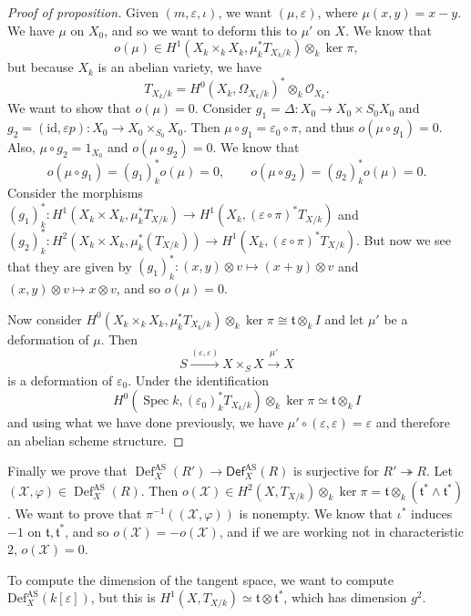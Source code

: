 \documentclass[leqno, openany]{memoir}
\theoremstyle{definition}
\theoremstyle{remark}
\theoremstyle{plain}
\theoremstyle{definition}
\theoremstyle{remark}
\newcommand{\ep}{\varepsilon}
\newcommand{\mc}[1]{\mathcal{#1}}
\newcommand{\mf}[1]{\mathfrak{#1}}
\newcommand{\mr}[1]{\mathrm{#1}}
\newcommand{\ms}[1]{\mathsf{#1}}
\DeclareMathOperator{\Def}{Def}
\DeclareMathOperator{\Spec}{Spec}
\begin{document}
\begin{proof}[Proof of proposition]
    Given $(m, \ep, \iota)$, we want $(\mu, \ep)$, where $\mu(x,y) = x-y$. We have $\mu$ on $X_0$, and so we want to deform this to $\mu'$ on $X$. We know that
    \[ o(\mu) \in H^1(X_k \times_k X_k, \mu_k^* T_{X_k/k}) \otimes_k \ker \pi, \]
    but because $X_k$ is an abelian variety, we have
    \[ T_{X_k/k} = H^0(X_k, \Omega_{X_k/k})^* \otimes_k \mc{O}_{X_k}. \]
    We want to show that $o(\mu) = 0$. Consider $g_1 = \Delta \colon X_0 \to X_0 \times S_0 X_0$ and $g_2 = (\mr{id}, \ep p) \colon X_0 \to X_0 \times_{S_0} X_0$. Then $\mu \circ g_1 = \ep_0 \circ \pi$, and thus $o(\mu \circ g_1) = 0$. Also, $\mu \circ g_2 = 1_{X_0}$ and $o(\mu \circ g_2) = 0$. We know that
    \[ o(\mu \circ g_1) = (g_1)_k^* o(\mu) = 0, \qquad o(\mu \circ g_2) = (g_2)_k^* o(\mu) = 0. \]
    Consider the morphisms $(g_1)_k^* \colon H^1(X_k \times X_k, \mu_k^* T_{X/k}) \to H^1(X_k, (\ep \circ \pi)^* T_{X/k})$ and $(g_2)_k^* \colon H^2(X_k \times X_k, \mu_k^*(T_{X/k})) \to H^1(X_k, (\ep \circ \pi)^* T_{X/k})$. But now we see that they are given by $(g_1)_k^* \colon (x, y) \otimes v \mapsto (x+y) \otimes v$ and $(x, y) \otimes v \mapsto x \otimes v$, and so $o(\mu) = 0$.

    Now consider $H^0(X_k \times_k X_k, \mu_k^* T_{X_k/k}) \otimes_k \ker \pi \cong \mf{t} \otimes_k I$ and let $\mu'$ be a deformation of $\mu$. Then
    \[ S \xrightarrow{(\ep, \ep)} X \times_S X \xrightarrow{\mu'} X \]
    is a deformation of $\ep_0$. Under the identification
    \[ H^0(\Spec k, (\ep_0)_k^* T_{X_k/k}) \otimes_k \ker \pi \simeq \mf{t} \otimes_k I \]
    and using what we have done previously, we have $\mu' \circ (\ep, \ep) = \ep$ and therefore an abelian scheme structure.
\end{proof}

Finally we prove that $\Def_X^{\mr{AS}}(R') \to \ms{Def}_X^{\mr{AS}}(R)$ is surjective for $R' \twoheadrightarrow R$. Let $(\mc{X}, \varphi) \in \Def_X^{\mr{AS}}(R)$. Then $o(\mc{X}) \in H^2(X, T_{X/k}) \otimes_k \ker \pi = \mf{t} \otimes_k (\mf{t}^* \wedge \mf{t}^*)$. We want to prove that $\pi^{-1}((\mc{X}, \varphi))$ is nonempty. We know that $\iota^*$ induces $-1$ on $\mf{t}, \mf{t}^*$, and so $o(\mc{X}) = - o(\mc{X})$, and if we are working not in characteristic $2$, $o(\mc{X}) = 0$.

To compute the dimension of the tangent space, we want to compute $\mr{Def}_X^{\mr{AS}}(k[\ep])$, but this is $H^1(X, T_{X/k}) \simeq \mf{t} \otimes \mf{t}^*$, which has dimension $g^2$.
\end{document}
